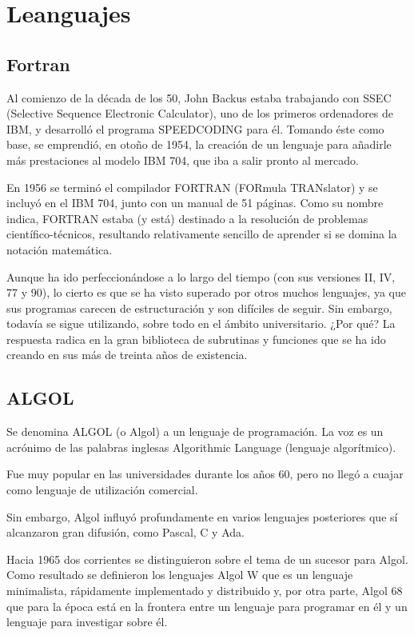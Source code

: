 \documentclass[twoside,twocolumn]{article}
\begin{document}


\section{Leanguajes}

\subsection{Fortran}

Al comienzo de la década de los 50, John Backus
estaba trabajando con SSEC (Selective Sequence Electronic Calculator), uno de los primeros ordenadores de
IBM, y desarrolló el programa SPEEDCODING para él.
Tomando éste como base, se emprendió, en otoño de
1954, la creación de un lenguaje para añadirle más
prestaciones al modelo IBM 704, que iba a salir pronto
al mercado.

En 1956 se terminó el compilador FORTRAN
(FORmula TRANslator) y se incluyó en el IBM 704,
junto con un manual de 51 páginas.
Como su nombre indica, FORTRAN estaba (y está)
destinado a la resolución de problemas científico-técnicos, resultando relativamente sencillo de aprender si se
domina la notación matemática.

Aunque ha ido perfeccionándose a lo largo del
tiempo (con sus versiones II, IV, 77 y 90), lo cierto es
que se ha visto superado por otros muchos lenguajes,
ya que sus programas carecen de estructuración y son
difíciles de seguir. Sin embargo, todavía se
sigue utilizando, sobre todo en el ámbito universitario.
¿Por qué? La respuesta radica en la gran biblioteca de
subrutinas y funciones que se ha ido creando en sus
más de treinta años de existencia.

\subsection{ALGOL}

Se denomina ALGOL (o Algol) a un lenguaje de programación. La voz es un acrónimo de las palabras inglesas Algorithmic Language (lenguaje algorítmico).

Fue muy popular en las universidades durante los años 60, pero no llegó a cuajar como lenguaje de utilización comercial.

Sin embargo, Algol influyó profundamente en varios lenguajes posteriores que sí alcanzaron gran difusión, como Pascal, C y Ada.

Hacia 1965 dos corrientes se distinguieron sobre el tema de un sucesor para Algol. Como resultado se definieron los lenguajes Algol W que es un lenguaje minimalista, rápidamente implementado y distribuido y, por otra parte, Algol 68 que para la época está en la frontera entre un lenguaje para programar en él y un lenguaje para investigar sobre él.
\end{document}
